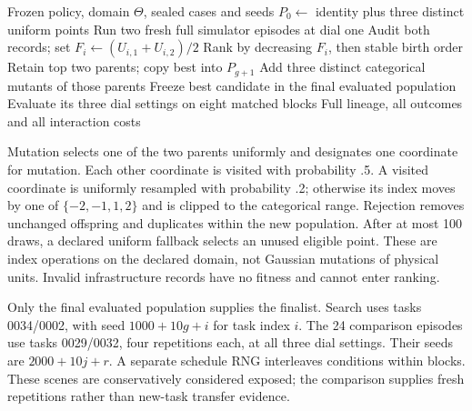 \documentclass[sigconf,dvipsnames]{acmart}
\begin{document}
\begin{algorithm}[t]
\caption{Executed Part 1 evolutionary search}
\label{alg:evolution}
\begin{algorithmic}[1]
\Require Frozen policy, domain $\Theta$, sealed cases and seeds
\State $P_0\gets$ identity plus three distinct uniform points
    \State Run two fresh full simulator episodes at dial one
    \State Audit both records; set $F_i\gets(U_{i,1}+U_{i,2})/2$
  \EndFor
  \State Rank by decreasing $F_i$, then stable birth order
    \State Retain top two parents; copy best into $P_{g+1}$
    \State Add three distinct categorical mutants of those parents
  \EndIf
\EndFor
\State Freeze best candidate in the final evaluated population
\State Evaluate its three dial settings on eight matched blocks
\Ensure Full lineage, all outcomes and all interaction costs
\end{algorithmic}
\end{algorithm}

Mutation selects one of the two parents uniformly and designates one coordinate
for mutation. Each other coordinate is visited with probability .5. A visited
coordinate is uniformly resampled with probability .2; otherwise its index moves
by one of $\{-2,-1,1,2\}$ and is clipped to the categorical range. Rejection removes
unchanged offspring and duplicates within the new population. After at most 100
draws, a declared uniform fallback selects an unused eligible point. These are
index operations on the declared domain, not Gaussian mutations of physical units.
Invalid infrastructure records have no fitness and cannot enter ranking.

Only the final evaluated population supplies the finalist. Search uses tasks
0034/0002, with seed $1000+10g+i$ for task index $i$. The 24 comparison episodes
use tasks 0029/0032, four repetitions each, at all three dial settings. Their seeds
are $2000+10j+r$. A separate schedule RNG interleaves conditions within blocks.
These scenes are conservatively considered exposed; the comparison supplies fresh
repetitions rather than new-task transfer evidence.
\end{document}
